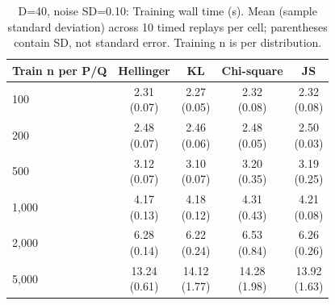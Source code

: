 \begin{table}[t]
\centering
\small
\setlength{\tabcolsep}{4pt}
\caption{D=40, noise SD=0.10: Training wall time (s). Mean (sample standard deviation) across 10 timed replays per cell; parentheses contain SD, not standard error. Training n is per distribution.}
\label{tab:sim-d-40-noise-sd-0-10-training-wall-time-s}
\begin{tabular}{lcccc}
\toprule
Train n per P/Q & Hellinger & KL & Chi-square & JS \\
\midrule
100 & \shortstack{2.31\\(0.07)} & \shortstack{2.27\\(0.05)} & \shortstack{2.32\\(0.08)} & \shortstack{2.32\\(0.08)} \\
200 & \shortstack{2.48\\(0.07)} & \shortstack{2.46\\(0.06)} & \shortstack{2.48\\(0.05)} & \shortstack{2.50\\(0.03)} \\
500 & \shortstack{3.12\\(0.07)} & \shortstack{3.10\\(0.07)} & \shortstack{3.20\\(0.35)} & \shortstack{3.19\\(0.25)} \\
1,000 & \shortstack{4.17\\(0.13)} & \shortstack{4.18\\(0.12)} & \shortstack{4.31\\(0.43)} & \shortstack{4.21\\(0.08)} \\
2,000 & \shortstack{6.28\\(0.14)} & \shortstack{6.22\\(0.24)} & \shortstack{6.53\\(0.84)} & \shortstack{6.26\\(0.26)} \\
5,000 & \shortstack{13.24\\(0.61)} & \shortstack{14.12\\(1.77)} & \shortstack{14.28\\(1.98)} & \shortstack{13.92\\(1.63)} \\
\bottomrule
\end{tabular}
\end{table}

